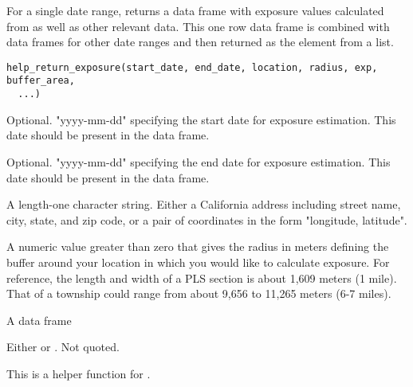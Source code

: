 \documentclass[a4paper]{book}
\begin{document}
%
\begin{Description}\relax
For a single date range,  returns a data frame with
exposure values calculated from  as well as other relevant
data. This one row data frame is combined with data frames for other date
ranges and then returned as the  element from a
 list.
\end{Description}
%
\begin{Usage}
\begin{verbatim}
help_return_exposure(start_date, end_date, location, radius, exp, buffer_area,
  ...)
\end{verbatim}
\end{Usage}
%
\begin{Arguments}
\begin{ldescription}
\item[\code{start\_date}] Optional. "yyyy-mm-dd" specifying the start date for
exposure estimation. This date should be present in the 
data frame.

\item[\code{end\_date}] Optional. "yyyy-mm-dd" specifying the end date for exposure
estimation. This date should be present in the 
data frame.

\item[\code{location}] A length-one character string. Either a California address
including street name, city, state, and zip code, or a pair of coordinates
in the form "longitude, latitude".

\item[\code{radius}] A numeric value greater than zero that gives the radius in meters
defining the buffer around your location in which you would like to
calculate exposure. For reference, the length and width of a PLS section is
about 1,609 meters (1 mile). That of a township could range from about
9,656 to 11,265 meters (6-7 miles).

\item[\code{exp}] A data frame

\item[\code{...}] Either  or . Not
quoted.
\end{ldescription}
\end{Arguments}
%
\begin{Details}\relax
This is a helper function for .
\end{Details}
\end{document}
